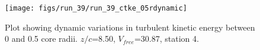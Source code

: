 \begin{figure}[H]
\centering
\texttt{[image: figs/run\_39/run\_39\_ctke\_05rdynamic]}
\caption{Plot showing dynamic variations in turbulent kinetic energy between 0 and 0.5 core radii. $z/c$=8.50, $V_{free}$=30.87, station 4.}
\label{fig:run_39_ctke_05rdynamic}
\end{figure}


